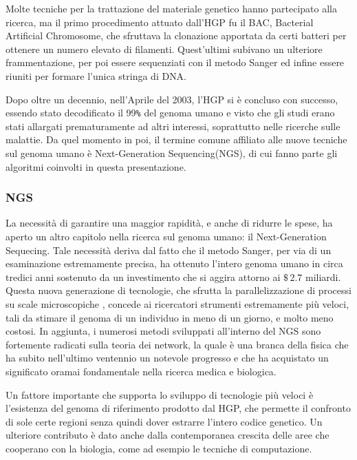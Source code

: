 Molte tecniche per la trattazione del materiale genetico hanno partecipato alla ricerca, ma il primo procedimento attuato dall'HGP fu il BAC, Bacterial Artificial Chromosome, che sfruttava la clonazione apportata da certi batteri per ottenere un numero elevato di filamenti.
Quest'ultimi subivano un ulteriore frammentazione, per poi essere sequenziati con il metodo Sanger ed infine essere riuniti per formare l'unica stringa di DNA.

Dopo oltre un decennio, nell'Aprile del 2003, l'HGP si è concluso con successo, essendo stato decodificato il 99\verb!%! del genoma umano e visto che gli studi erano stati allargati prematuramente ad altri interessi, soprattutto nelle ricerche sulle malattie.
Da quel momento in poi, il termine comune affiliato alle nuove tecniche sul genoma umano è Next-Generation Sequencing(NGS), di cui fanno parte gli algoritmi coinvolti in questa presentazione.

\subsubsection{NGS}
La necessità di garantire una maggior rapidità, e anche di ridurre le spese, ha aperto un altro capitolo nella ricerca sul genoma umano: il Next-Generation Sequecing\cite{Behjati2013}.
Tale necessità deriva dal fatto che il metodo Sanger, per via di un esaminazione estremamente precisa, ha ottenuto l'intero genoma umano in circa tredici anni sostenuto da un investimento che si aggira attorno ai $\$\,2.7$ miliardi. 
Questa nuova generazione di tecnologie, che sfrutta la parallelizzazione di processi su scale microscopiche \cite{Shendure2008}, concede ai ricercatori strumenti estremamente più veloci, tali da stimare il genoma di un individuo in meno di un giorno, e molto meno costosi.
In aggiunta, i numerosi metodi sviluppati all'interno del NGS sono fortemente radicati sulla teoria dei network, la quale è una branca della fisica che ha subito nell'ultimo ventennio un notevole progresso e che ha acquistato un significato oramai fondamentale nella ricerca medica e biologica. 

Un fattore importante che supporta lo sviluppo di tecnologie più veloci è l'esistenza del genoma di riferimento prodotto dal HGP, che permette il confronto di sole certe regioni senza quindi dover estrarre l'intero codice genetico.
Un ulteriore contributo è dato anche dalla contemporanea crescita delle aree che cooperano con la biologia, come ad esempio le tecniche di computazione.

